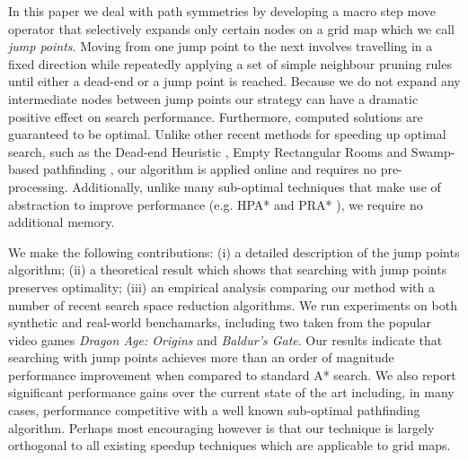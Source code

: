 In this paper we deal with path symmetries by developing a macro step move
operator that selectively expands only certain nodes on a grid map which
we call \emph{jump points}. Moving from one jump point to the next involves 
travelling in a fixed direction while repeatedly applying a set of simple
neighbour pruning rules until either a dead-end or a jump point is reached.
Because we do not expand any intermediate nodes between jump points
our strategy can have a dramatic positive effect on search performance.
Furthermore, computed solutions are guaranteed to be optimal.
Unlike other recent methods for speeding up optimal search, such as the Dead-end
Heuristic
\cite{bjornsson05}, Empty Rectangular Rooms \cite{harabor10} and Swamp-based
pathfinding \cite{pochter10}, our algorithm is applied online and requires no
pre-processing.  Additionally, unlike many sub-optimal techniques that make use 
of abstraction to improve performance (e.g. HPA* \cite{botea04} and PRA*
\cite{sturtevant05}), we require
no additional memory.

We make the following contributions: (i) a detailed description of the 
jump points algorithm; (ii) a theoretical result which shows that searching
with jump points preserves optimality;  (iii) an empirical analysis 
comparing our method with a number of recent search space reduction
algorithms.
We run experiments on both synthetic and real-world 
benchamarks, including two taken from the popular video games \emph{Dragon Age:
Origins} and \emph{Baldur's Gate}.  
Our results indicate that searching with jump points achieves more than an 
order of magnitude performance improvement when compared to standard A* search. 
We also report significant performance gains over the current state of the art
including, in many cases, performance competitive with a well known sub-optimal 
pathfinding algorithm.
Perhaps most encouraging however is that our technique is largely orthogonal to 
all existing speedup techniques which are applicable to grid maps.

% 
